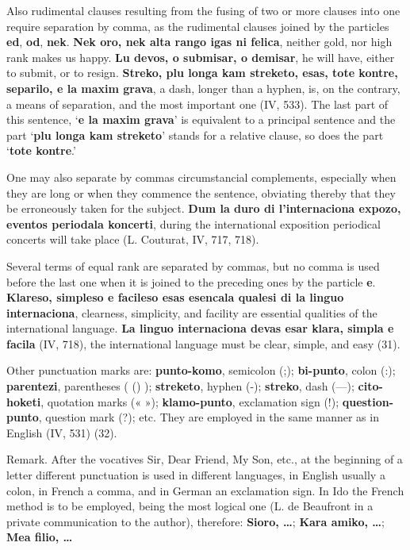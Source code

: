 Also rudimental clauses resulting from the fusing of two or more clauses into one require separation by comma, as the rudimental clauses joined by the particles \textbf{ed}, \textbf{od}, \textbf{nek}. \textbf{Nek oro, nek alta rango igas ni felica}, neither gold, nor high rank makes us happy. \textbf{Lu devos, o submisar, o demisar}, he will have, either to submit, or to resign. \textbf{Streko, plu longa kam streketo, esas, tote kontre, separilo, e la maxim grava}, a dash, longer than a hyphen, is, on the contrary, a means of separation, and the most important one (IV, 533). The last part of this sentence, `\textbf{e la maxim grava}' is equivalent to a principal sentence and the part `\textbf{plu longa kam streketo}' stands for a relative clause, so does the part `\textbf{tote kontre}.' 

One may also separate by commas circumstancial complements, especially when they are long or when they commence the sentence, obviating thereby that they be erroneously taken for the subject. \textbf{Dum la duro di l'internaciona expozo, eventos periodala koncerti}, during the international exposition periodical concerts will take place (L. Couturat, IV, 717, 718). 

Several terms of equal rank are separated by commas, but no comma is used before the last one when it is joined to the preceding ones by the particle \textbf{e}. \textbf{Klareso, simpleso e facileso esas esencala qualesi di la linguo internaciona}, clearness, simplicity, and facility are essential qualities of the international language. \textbf{La linguo internaciona devas esar klara, simpla e facila} (IV, 718), the international language must be clear, simple, and easy (31).

Other punctuation marks are: \textbf{punto-komo}, semicolon (;); \textbf{bi-punto}, colon (:); \textbf{parentezi}, parentheses ( () ); \textbf{streketo}, hyphen (-); \textbf{streko}, dash (—); \textbf{cito-hoketi}, quotation marks (« »); \textbf{klamo-punto}, exclamation sign (!); \textbf{question-punto}, question mark (?); etc. They are employed in the same manner as in English (IV, 531) (32). 

\small Remark. After the vocatives Sir, Dear Friend, My Son, etc., at the beginning of a letter different punctuation is used in different languages, in English usually a colon, in French a comma, and in German an exclamation sign. In Ido the French method is to be employed, being the most logical one (L. de Beaufront in a private communication to the author), therefore: \textbf{Sioro, \ldots}; \textbf{Kara amiko, \ldots}; \textbf{Mea filio, \ldots} \normalsize

